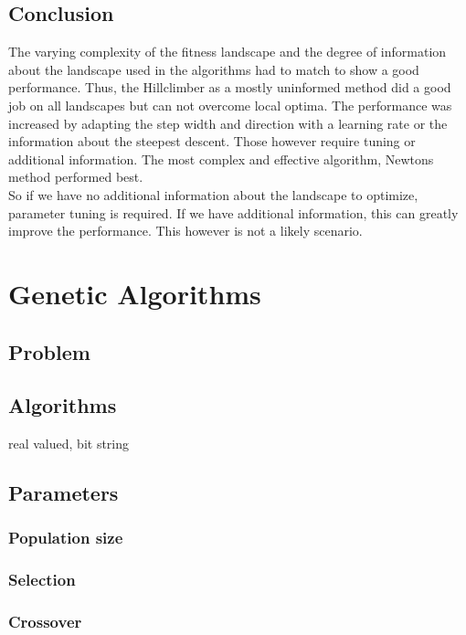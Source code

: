 \documentclass{scrartcl}
\begin{document}
\subsection{Conclusion}
The varying complexity of the fitness landscape and the degree of information about the landscape used in the algorithms had to match to show a good performance. Thus, the Hillclimber as a mostly uninformed method did a good job on all landscapes but can not overcome local optima. The performance was increased by adapting the step width and direction with a learning rate or the information about the steepest descent. Those however require tuning or additional information. The most complex and effective algorithm, Newtons method performed best.\\
So if we have no additional information about the landscape to optimize, parameter tuning is required. If we have additional information, this can greatly improve the performance. This however is not a likely scenario.



\section{Genetic Algorithms}

\subsection{Problem}

\subsection{Algorithms}
real valued, bit string

\subsection{Parameters}
\subsubsection{Population size}
\subsubsection{Selection}
\subsubsection{Crossover}
\end{document}
